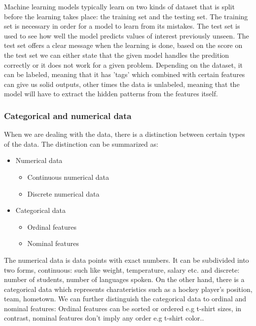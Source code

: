 \documentclass[a4paper,oneside,openright,11pt]{book}
\begin{document}
Machine learning models typically learn on two kinds of dataset that is split before the learning takes place: the training set and the testing set. The training set is necessary in order for a model to learn from its mistakes. The test set is used to see how well the model predicts values of interest previously unseen. The test set offers a clear message when the learning is done, based on the score on the test set we can either state that the given model handles the predition correctly or it does not work for a given problem. Depending on the dataset, it can be labeled, meaning that it has 'tags' which combined with certain features can give us solid outputs, other times the data is unlabeled, meaning that the model will have to extract the hidden patterns from the features itself.

\subsubsection{Categorical and numerical data}

When we are dealing with the data, there is a distinction between certain types of the data. The distinction can be summarized as:

\begin{itemize}
    \item Numerical data
    \begin{itemize}
        \item Continuous numerical data
        \item Discrete numerical data
    \end{itemize}
    \item Categorical data
    \begin{itemize}
        \item Ordinal features
        \item Nominal features
    \end{itemize}
\end{itemize}

The numerical data is data points with exact numbers. It can be subdivided into two forms, continuous: such like weight, temperature, salary etc. and discrete: number of students, number of languages spoken. On the other hand, there is a categorical data which represents charateristics such as a hockey player’s position, team, hometown. We can further distinguish the categorical data to ordinal and nominal features: Ordinal features can be sorted or ordered e.g t-shirt sizes, in contrast, nominal features don't imply any order e.g t-shirt color.\cite{raschka}\cite{numericalData}.
\end{document}
